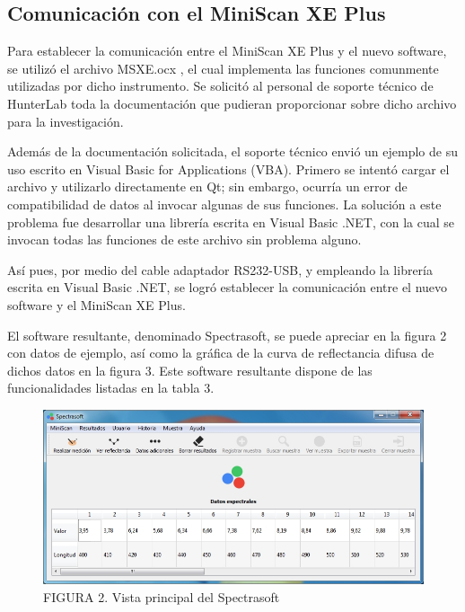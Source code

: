 \documentclass[conference]{IEEEtran}
\begin{document}
\subsection{Comunicaci\'{o}n con el MiniScan XE Plus}
	
	Para establecer la comunicaci\'{o}n entre el MiniScan XE Plus y el nuevo software, se utiliz\'{o} el archivo MSXE.ocx \cite{MiniScanXEPlus-manual}, el cual implementa las funciones comunmente utilizadas por dicho instrumento. Se solicit\'{o} al personal de soporte t\'{e}cnico de HunterLab toda la documentaci\'{o}n que pudieran proporcionar sobre dicho archivo para la investigaci\'{o}n.
	
	Adem\'{a}s de la documentaci\'{o}n solicitada, el soporte t\'{e}cnico envi\'{o} un ejemplo de su uso escrito en Visual Basic for Applications (VBA). Primero se intent\'{o} cargar el archivo y utilizarlo directamente en Qt; sin embargo, ocurr\'{i}a un error de compatibilidad de datos al invocar algunas de sus funciones. La soluci\'{o}n a este problema fue desarrollar una librer\'{i}a escrita en Visual Basic .NET, con la cual se invocan todas las funciones de este archivo sin problema alguno.

	As\'{i} pues, por medio del cable adaptador RS232-USB, y empleando la librer\'{i}a escrita en Visual Basic .NET, se logr\'{o} establecer la comunicaci\'{o}n entre el nuevo software y el MiniScan XE Plus.
	
	El software resultante, denominado Spectrasoft, se puede apreciar en la figura 2 con datos de ejemplo, as\'{i} como la gr\'{a}fica de la curva de reflectancia difusa de dichos datos en la figura 3. Este software resultante dispone de las funcionalidades listadas en la tabla 3.

\begin{figure}[h]
  \includegraphics[scale=.8]{./img/spectrasoft.jpg}
  \caption{FIGURA 2. Vista principal del Spectrasoft}
\end{figure}
\end{document}
